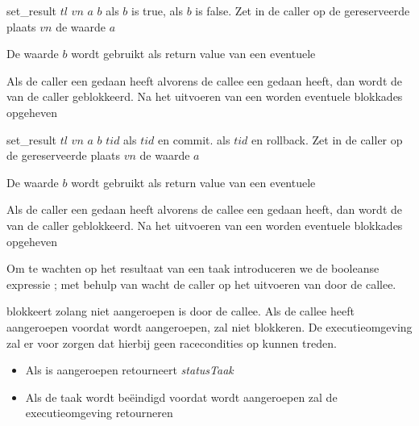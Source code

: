 \begin{functie}{set_result $tl$ $vn$ $a$ $b$}
	\functieresultaat{}  als $b$ is true,  als $b$ is false.
	\functieomschrijving
	Zet in de caller op de gereserveerde plaats \(vn\) de waarde \(a\)

	De waarde $b$ wordt gebruikt als return value van een eventuele 

	Als de caller een  gedaan heeft alvorens de callee een  gedaan heeft, dan wordt de 
	van de caller geblokkeerd. Na het uitvoeren van een  worden eventuele blokkades opgeheven
\end{functie}

\begin{functie}{set_result $tl$ $vn$ $a$ $b$ $tid$}
	\functieresultaat{}  als $tid$ en commit.  als $tid$ en rollback.
	\functieomschrijving
	Zet in de caller op de gereserveerde plaats \(vn\) de waarde \(a\)

	De waarde $b$ wordt gebruikt als return value van een eventuele 

	Als de caller een  gedaan heeft alvorens de callee een  gedaan heeft, dan wordt de 
	van de caller geblokkeerd. Na het uitvoeren van een  worden eventuele blokkades opgeheven
\end{functie}

Om te wachten op het resultaat van een taak introduceren we de booleanse expressie ; met behulp van 
wacht de caller op het uitvoeren van  door de callee.

 blokkeert zolang  niet aangeroepen is door de callee. Als de callee  heeft
aangeroepen voordat  wordt aangeroepen, zal  niet blokkeren. De executieomgeving zal er voor
zorgen dat hierbij geen racecondities op kunnen treden.

\begin{itemize}
\item Als  is aangeroepen retourneert  \textsl{statusTaak}
\item Als de taak wordt be\"eindigd voordat  wordt aangeroepen zal de executieomgeving 
retourneren
\end{itemize}

